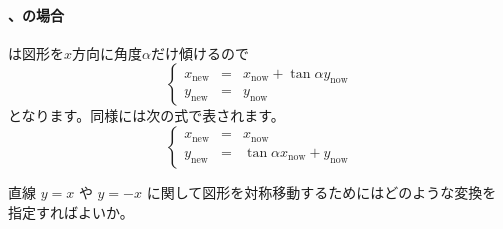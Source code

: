 \paragraph{、の場合}
は図形を$x$方向に角度$\alpha$だけ傾けるので
\begin{equation*}
 \left\{\begin{array}{rcl}
 x_{\mathrm{new}} &=& x_{\mathrm{now}}+\tan\alpha y_{\mathrm{now}} \\
 y_{\mathrm{new}} &=& y_{\mathrm{now}}
	\end{array}\right.
\end{equation*}
となります。同様には次の式で表されます。
\begin{equation*}
 \left\{\begin{array}{rcl}
 x_{\mathrm{new}} &=&  x_{\mathrm{now}} \\
 y_{\mathrm{new}} &=& \tan\alpha　x_{\mathrm{now}}+y_{\mathrm{now}}
	\end{array}\right.
\end{equation*}

\begin{Problem}
 直線 $y=x$ や $y=-x$ に関して図形を対称移動するためにはどのような変換を
 指定すればよいか。
\end{Problem}